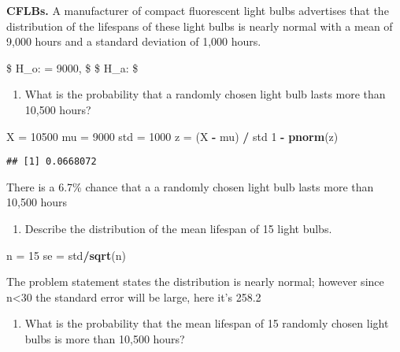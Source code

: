 \documentclass[
]{article}
\newenvironment{Shaded}{\begin{snugshade}}{\end{snugshade}}
\newcommand{\DecValTok}[1]{\textcolor[rgb]{0.00,0.00,0.81}{#1}}
\newcommand{\KeywordTok}[1]{\textcolor[rgb]{0.13,0.29,0.53}{\textbf{#1}}}
\newcommand{\NormalTok}[1]{#1}
\newcommand{\OperatorTok}[1]{\textcolor[rgb]{0.81,0.36,0.00}{\textbf{#1}}}
\newcommand{\StringTok}[1]{\textcolor[rgb]{0.31,0.60,0.02}{#1}}
\providecommand{\tightlist}{%
  \setlength{\itemsep}{0pt}\setlength{\parskip}{0pt}}
\begin{document}
\clearpage

\textbf{CFLBs.} A manufacturer of compact fluorescent light bulbs
advertises that the distribution of the lifespans of these light bulbs
is nearly normal with a mean of 9,000 hours and a standard deviation of
1,000 hours.

\$ H\_o: \mu = 9000, \$ \$ H\_a: \$

\begin{enumerate}
\def\labelenumi{(\alph{enumi})}
\tightlist
\item
  What is the probability that a randomly chosen light bulb lasts more
  than 10,500 hours?
\end{enumerate}

\begin{Shaded}
\begin{Highlighting}[]
\NormalTok{X =}\StringTok{ }\DecValTok{10500}
\NormalTok{mu =}\StringTok{ }\DecValTok{9000}
\NormalTok{std =}\StringTok{ }\DecValTok{1000}
\NormalTok{z =}\StringTok{ }\NormalTok{(X }\OperatorTok{-}\StringTok{ }\NormalTok{mu) }\OperatorTok{/}\StringTok{ }\NormalTok{std}
\DecValTok{1} \OperatorTok{-}\StringTok{ }\KeywordTok{pnorm}\NormalTok{(z)}
\end{Highlighting}
\end{Shaded}

\begin{verbatim}
## [1] 0.0668072
\end{verbatim}

There is a 6.7\% chance that a a randomly chosen light bulb lasts more
than 10,500 hours

\begin{enumerate}
\def\labelenumi{(\alph{enumi})}
\setcounter{enumi}{1}
\tightlist
\item
  Describe the distribution of the mean lifespan of 15 light bulbs.
\end{enumerate}

\begin{Shaded}
\begin{Highlighting}[]
\NormalTok{n =}\StringTok{ }\DecValTok{15}
\NormalTok{se =}\StringTok{ }\NormalTok{std}\OperatorTok{/}\KeywordTok{sqrt}\NormalTok{(n)}
\end{Highlighting}
\end{Shaded}

The problem statement states the distribution is nearly normal; however
since n\textless30 the standard error will be large, here it's 258.2

\begin{enumerate}
\def\labelenumi{(\alph{enumi})}
\setcounter{enumi}{2}
\tightlist
\item
  What is the probability that the mean lifespan of 15 randomly chosen
  light bulbs is more than 10,500 hours?
\end{enumerate}
\end{document}
